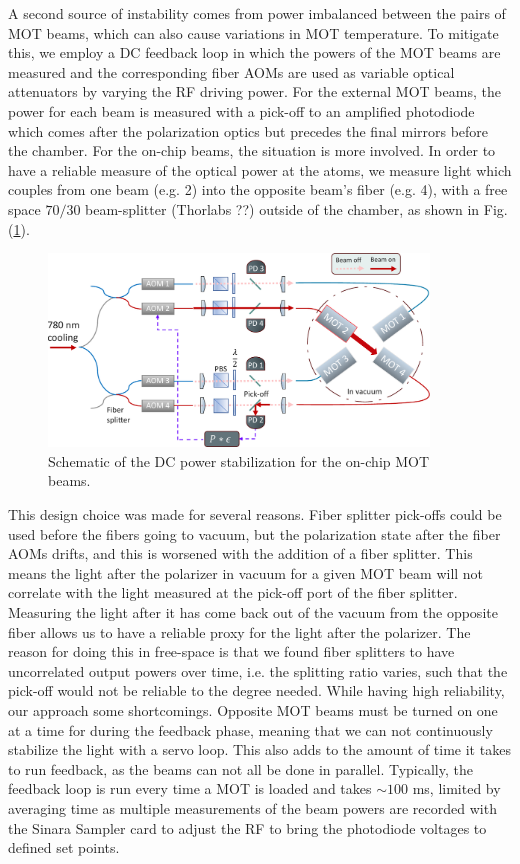 A second source of instability comes from power imbalanced between the pairs of MOT beams, which can also cause variations in MOT temperature. To mitigate this, we employ a DC feedback loop in which the powers of the MOT beams are measured and the corresponding fiber AOMs are used as variable optical attenuators by varying the RF driving power. For the external MOT beams, the power for each beam is measured with a pick-off to an amplified photodiode \cite{Ebert2017thesis} which comes after the polarization optics but precedes the final mirrors before the chamber. For the on-chip beams, the situation is more involved. In order to have a reliable measure of the optical power at the atoms, we measure light which couples from one beam (e.g. 2) into the opposite beam's fiber (e.g. 4), with a free space $70/30$ beam-splitter (Thorlabs ??) outside of the chamber, as shown in Fig. (\ref{fig:mot_feedback}). 
\begin{figure}[!ht]
    \centering
    \includegraphics[width=0.9\textwidth]{Images/on_chip_mot_feedback.pdf}
    \caption{Schematic of the DC power stabilization for the on-chip
    MOT beams.}
    \label{fig:mot_feedback}
\end{figure}
This design choice was made for several reasons. Fiber splitter pick-offs could be used before the fibers going to vacuum, but the polarization state after the fiber AOMs drifts, and this is worsened with the addition of a fiber splitter. This means the light after the polarizer in vacuum for a given MOT beam will not correlate with the light measured at the pick-off port of the fiber splitter. Measuring the light after it has come back out of the vacuum  from the opposite fiber allows us to have a reliable proxy for the  light after the polarizer. The reason for doing this in free-space is that we found fiber splitters to have uncorrelated output powers over time, i.e. the splitting ratio varies, such that the pick-off would not be reliable to the degree needed. While having high reliability, our approach some shortcomings. Opposite MOT beams must be turned on one at a time for during the feedback phase, meaning that we can not continuously stabilize the light with a servo loop. This also adds to the amount of time it takes to run feedback, as the beams can not all be done in parallel. Typically, the feedback loop is run every time a MOT is loaded and takes $\sim 100$ ms, limited by averaging time as multiple measurements of the beam powers are recorded with the Sinara Sampler card to adjust the RF to bring the photodiode voltages to defined set points.

